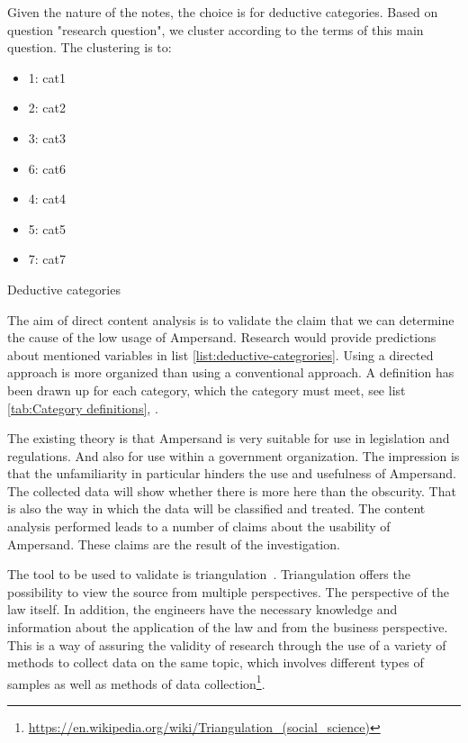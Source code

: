 Given the nature of the notes, the choice is for deductive categories\citep{mayring_qualitative_2019}.
Based on question "\acrlong{research question}", we cluster according to the terms of this main question.
The clustering is to:
\begin{mylist}
    \begin{itemize}
        \item 1: \acrshort{cat1}
        \item 2: \acrshort{cat2}
        \item 3: \acrshort{cat3}
        \item 6: \acrshort{cat6}
        \item 4: \acrshort{cat4}
        \item 5: \acrshort{cat5}
        \item 7: \acrshort{cat7}
    \end{itemize}
    \caption{Deductive categories}
    \label{list:deductive-categrories}
\end{mylist}
The aim of direct content analysis is to validate the claim that we can determine the cause of the low usage of Ampersand.
Research would provide predictions about mentioned variables in list \ref{list:deductive-categrories}.
Using a directed approach is more organized than using a conventional approach.
A definition has been drawn up for each category, which the category must meet, see list \ref{tab:Category definitions}, .
\begin{comment}
    It starts with identifying category, after which operational definitions are determined per category.
    Based on the research question, the data and the objectives of the researcher, the following strategy can be followed in labeling/coding.
    The strategy starts with labeling using the predetermined codes.
    In the process, information that could not be encoded is recognized and later analyzed to decide whether they represent a new category in the encoding scheme.
\end{comment}
The existing theory is that Ampersand is very suitable for use in legislation and regulations.
And also for use within a government organization.
The impression is that the unfamiliarity in particular hinders the use and usefulness of Ampersand.
The collected data will show whether there is more here than the obscurity.
That is also the way in which the data will be classified and treated.
The content analysis performed leads to a number of claims about the usability of Ampersand.
These claims are the result of the investigation.

The tool to be used to validate is triangulation~\citep{carter_use_2014, farquhar_triangulation_2020, runeson_guidelines_2008}.
Triangulation offers the possibility to view the source from multiple perspectives.
The perspective of the law itself.
In addition, the engineers have the necessary knowledge and information about the application of the law and from the business perspective.
This is a way of assuring the validity of research through the use of a variety of methods to collect data on the same topic, which involves different types of samples as well as methods of data collection\footnote{\url{https://en.wikipedia.org/wiki/Triangulation_(social_science)}}.

